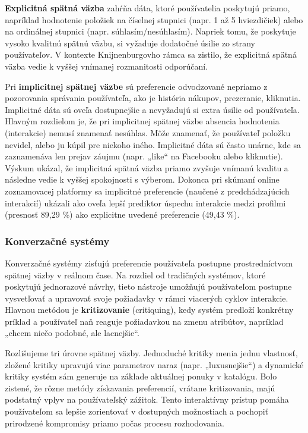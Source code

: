 \textbf{Explicitná spätná väzba} zahŕňa dáta, ktoré používatelia poskytujú priamo, napríklad hodnotenie položiek na číselnej stupnici (napr. 1 až 5 hviezdičiek) alebo na ordinálnej stupnici (napr. súhlasím/nesúhlasím).\cite{47, Ricci, Aggarwal} Napriek tomu, že poskytuje vysoko kvalitnú spätnú väzbu, si vyžaduje dodatočné úsilie zo strany používateľov.\cite{Ricci, Aggarwal} V kontexte Knijnenburgovho rámca sa zistilo, že explicitná spätná väzba vedie k vyššej vnímanej rozmanitosti odporúčaní. \cite{Knij}

Pri \textbf{implicitnej spätnej väzbe} sú preferencie odvodzované nepriamo z pozorovania správania používateľa, ako je história nákupov, prezeranie, kliknutia. Implicitné dáta sú oveľa dostupnejšie a nevyžadujú si extra úsilie od používateľa. \cite{Knij, Ricci, Aggarwal}
Hlavným rozdielom je, že pri implicitnej spätnej väzbe absencia hodnotenia (interakcie) nemusí znamenať nesúhlas. Môže znamenať, že používateľ položku nevidel, alebo ju kúpil pre niekoho iného. Implicitné dáta sú často unárne, kde sa zaznamenáva len prejav záujmu (napr. „like“ na Facebooku alebo kliknutie). \cite{Ricci, Aggarwal}
Výskum ukázal, že implicitná spätná väzba priamo zvyšuje vnímanú kvalitu a následne vedie k vyššej spokojnosti s výberom.\cite{Knij} Dokonca pri skúmaní online zoznamovacej platformy sa implicitné preferencie (naučené z predchádzajúcich interakcií) ukázali ako oveľa lepší prediktor úspechu interakcie medzi profilmi (presnosť 89,29 \%) ako explicitne uvedené preferencie (49,43 \%).\cite{Ricci}

\subsubsection{Konverzačné systémy}

Konverzačné systémy zisťujú preferencie používateľa postupne prostredníctvom spätnej väzby v reálnom čase. Na rozdiel od tradičných systémov, ktoré poskytujú jednorazové návrhy, tieto nástroje umožňujú používateľom postupne vysvetľovať a upravovať svoje požiadavky v rámci viacerých cyklov interakcie.\cite{Aggarwal} Hlavnou metódou je \textbf{kritizovanie} (critiquing), kedy systém predloží konkrétny príklad a používateľ naň reaguje požiadavkou na zmenu atribútov, napríklad „chcem niečo podobné, ale lacnejšie“.\cite{Ricci, Aggarwal}

Rozlišujeme tri úrovne spätnej väzby. Jednoduché kritiky menia jednu vlastnosť, zložené kritiky upravujú viac parametrov naraz (napr. „luxusnejšie“) a dynamické kritiky systém sám generuje na základe aktuálnej ponuky v katalógu. Bolo zistené, že rôzne metódy získavania preferencií, vrátane kritizovania, majú podstatný vplyv na používateľský zážitok.\cite{Aggarwal, Ricci, Jannach} Tento interaktívny prístup pomáha používateľom sa lepšie zorientovať v dostupných možnostiach a pochopiť prirodzené kompromisy priamo počas procesu rozhodovania.\cite{Aggarwal}

